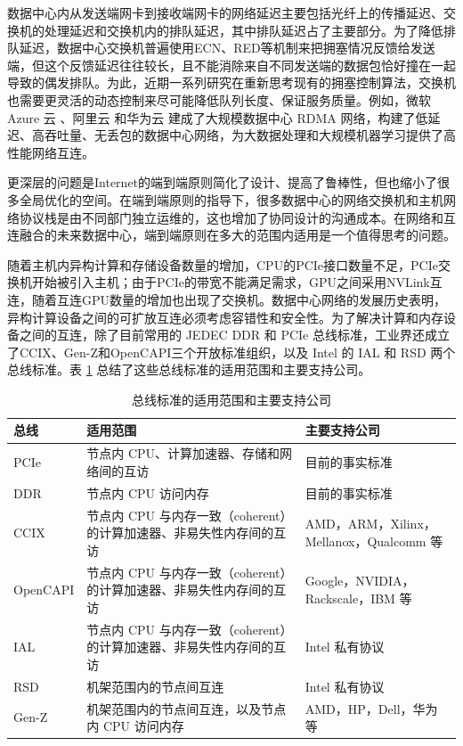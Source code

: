数据中心内从发送端网卡到接收端网卡的网络延迟主要包括光纤上的传播延迟、交换机的处理延迟和交换机内的排队延迟，其中排队延迟占了主要部分。为了降低排队延迟，数据中心交换机普遍使用ECN、RED等机制来把拥塞情况反馈给发送端，但这个反馈延迟往往较长，且不能消除来自不同发送端的数据包恰好撞在一起导致的偶发排队。为此，近期一系列研究在重新思考现有的拥塞控制算法，交换机也需要更灵活的动态控制来尽可能降低队列长度、保证服务质量。例如，微软 Azure 云 \cite{guo2016rdma}、阿里云 \cite{aliyun-rdma} 和华为云 \cite{huawei-lossless} 建成了大规模数据中心 RDMA 网络，构建了低延迟、高吞吐量、无丢包的数据中心网络，为大数据处理和大规模机器学习提供了高性能网络互连。

更深层的问题是Internet的端到端原则简化了设计、提高了鲁棒性，但也缩小了很多全局优化的空间。在端到端原则的指导下，很多数据中心的网络交换机和主机网络协议栈是由不同部门独立运维的，这也增加了协同设计的沟通成本。在网络和互连融合的未来数据中心，端到端原则在多大的范围内适用是一个值得思考的问题。

随着主机内异构计算和存储设备数量的增加，CPU的PCIe接口数量不足，PCIe交换机开始被引入主机；由于PCIe的带宽不能满足需求，GPU之间采用NVLink互连，随着互连GPU数量的增加也出现了交换机。数据中心网络的发展历史表明，异构计算设备之间的可扩放互连必须考虑容错性和安全性。为了解决计算和内存设备之间的互连，除了目前常用的 JEDEC DDR 和 PCIe 总线标准，工业界还成立了CCIX、Gen-Z和OpenCAPI三个开放标准组织，以及 Intel 的 IAL 和 RSD 两个总线标准。表 \ref{background:tab:ccix-pcie} 总结了这些总线标准的适用范围和主要支持公司。

\begin{table}[htbp]
	\centering
	\caption{总线标准的适用范围和主要支持公司}
	\small
	\begin{tabular}{l|p{}|p{}}
		\hline
		总线 & 适用范围 & 主要支持公司 \\
		\hline
		\hline
		PCIe & 节点内 CPU、计算加速器、存储和网络间的互访 & 目前的事实标准 \\
		\hline
		DDR & 节点内 CPU 访问内存 & 目前的事实标准 \\
		\hline
		CCIX & 节点内 CPU 与内存一致（coherent）的计算加速器、非易失性内存间的互访 & AMD，ARM，Xilinx，Mellanox，Qualcomm 等 \\
		\hline
		OpenCAPI & 节点内 CPU 与内存一致（coherent）的计算加速器、非易失性内存间的互访 & Google，NVIDIA，Rackscale，IBM 等 \\
		\hline
		IAL & 节点内 CPU 与内存一致（coherent）的计算加速器、非易失性内存间的互访 & Intel 私有协议 \\
		\hline
		RSD & 机架范围内的节点间互连 & Intel 私有协议 \\
		\hline
		Gen-Z & 机架范围内的节点间互连，以及节点内 CPU 访问内存 & AMD，HP，Dell，华为等 \\
		\hline
	\end{tabular}
	\label{background:tab:ccix-pcie}
\end{table}

